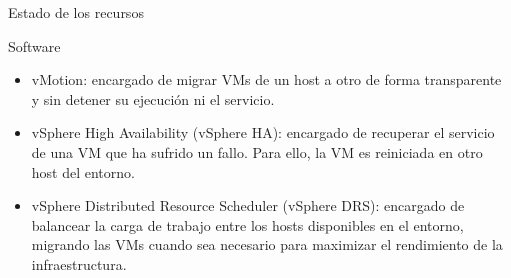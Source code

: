 \begin{chapter}{Estado de los recursos}
\begin{section}{Software}
    \begin{itemize}
        \item vMotion: encargado de migrar VMs de un host a otro de forma transparente y sin detener su ejecución ni el servicio.
        
        \item vSphere High Availability (vSphere HA): encargado de recuperar el servicio de una VM que ha sufrido un fallo. Para ello, la VM es reiniciada en otro host del entorno.
        
        \item vSphere Distributed Resource Scheduler (vSphere DRS): encargado de balancear la carga de trabajo entre los hosts disponibles en el entorno, migrando las VMs cuando sea necesario para maximizar el rendimiento de la infraestructura. 
        
        
    \end{itemize}
\end{section}


\end{chapter}
